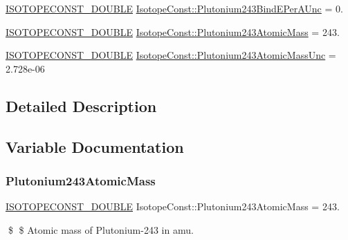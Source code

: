 \begin{DoxyCompactItemize}
\mbox{\hyperlink{group___isotope_const-_macros_ga8f45a7272ce02c0b4c65c44636ed719a}{I\+S\+O\+T\+O\+P\+E\+C\+O\+N\+S\+T\+\_\+\+D\+O\+U\+B\+LE}} \mbox{\hyperlink{group___isotope_const-_plutonium-_pu243_ga7efef0db55abb927f914cc2e7ddf88af}{Isotope\+Const\+::\+Plutonium243\+Bind\+E\+Per\+A\+Unc}} = 0.
\item 
\mbox{\hyperlink{group___isotope_const-_macros_ga8f45a7272ce02c0b4c65c44636ed719a}{I\+S\+O\+T\+O\+P\+E\+C\+O\+N\+S\+T\+\_\+\+D\+O\+U\+B\+LE}} \mbox{\hyperlink{group___isotope_const-_plutonium-_pu243_ga35d808e3a45700ea31deaecdf9726a44}{Isotope\+Const\+::\+Plutonium243\+Atomic\+Mass}} = 243.
\item 
\mbox{\hyperlink{group___isotope_const-_macros_ga8f45a7272ce02c0b4c65c44636ed719a}{I\+S\+O\+T\+O\+P\+E\+C\+O\+N\+S\+T\+\_\+\+D\+O\+U\+B\+LE}} \mbox{\hyperlink{group___isotope_const-_plutonium-_pu243_ga13fee8694377f5c4964e742fafe051d4}{Isotope\+Const\+::\+Plutonium243\+Atomic\+Mass\+Unc}} = 2.\+728e-\/06
\end{DoxyCompactItemize}


\subsection{Detailed Description}


\subsection{Variable Documentation}
\mbox{\label{group___isotope_const-_plutonium-_pu243_ga35d808e3a45700ea31deaecdf9726a44}} 
\subsubsection{\texorpdfstring{Plutonium243\+Atomic\+Mass}{Plutonium243AtomicMass}}
{\footnotesize\ttfamily \mbox{\hyperlink{group___isotope_const-_macros_ga8f45a7272ce02c0b4c65c44636ed719a}{I\+S\+O\+T\+O\+P\+E\+C\+O\+N\+S\+T\+\_\+\+D\+O\+U\+B\+LE}} Isotope\+Const\+::\+Plutonium243\+Atomic\+Mass = 243.}

\$ \$ Atomic mass of Plutonium-\/243 in amu. \mbox{\label{group___isotope_const-_plutonium-_pu243_ga13fee8694377f5c4964e742fafe051d4}} 
